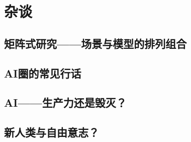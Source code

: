 \section{杂谈}
\subsection{矩阵式研究——场景与模型的排列组合}
\subsection{AI圈的常见行话}
\subsection{AI——生产力还是毁灭？}
\subsection{新人类与自由意志？}